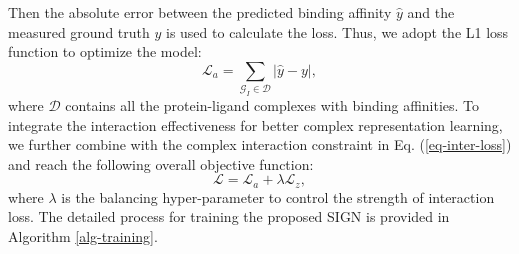 \documentclass[sigconf]{acmart}
\newcommand{\model}{\textsf{SIGN}\xspace}
\newcommand{\graph}{\ensuremath{\mathcal{G}_I}}
\begin{document}
Then the absolute error between the predicted binding affinity $\hat{y}$ and the measured ground truth $y$ is used to calculate the loss. Thus, we adopt the L1 loss function to optimize the model: 
\begin{equation}
\label{eq-pred-loss}
    \bm{\mathcal{L}}_a =\sum_{\graph \in \mathcal{D}} | \hat{y} - y |,
\end{equation}
where $\mathcal{D}$ contains all the protein-ligand complexes with binding affinities. To integrate the interaction effectiveness for better complex representation learning, we further combine with the complex interaction constraint in Eq. (\ref{eq-inter-loss}) and reach the following overall objective function:
\begin{equation}
\label{eq-add-loss}
    \bm{\mathcal{L}} = \bm{\mathcal{L}}_a + \lambda\bm{\mathcal{L}}_z,
\end{equation}
where $\lambda$ is the balancing hyper-parameter to control the strength of interaction loss. The detailed process for training the proposed \model is provided in Algorithm \ref{alg-training}.

















%
\end{document}
